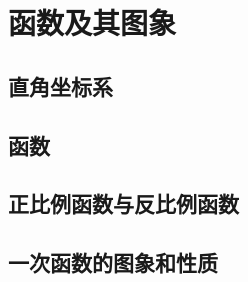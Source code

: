 \chapter{函数及其图象}

\section{直角坐标系}




\section{函数}




\section{正比例函数与反比例函数}




\section{一次函数的图象和性质}




